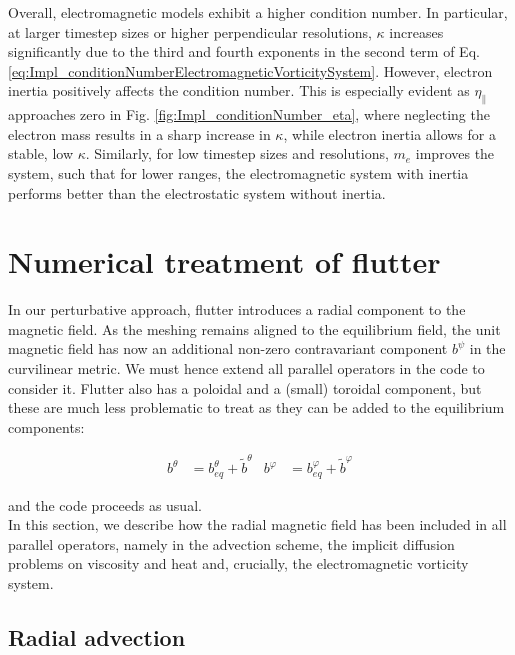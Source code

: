 Overall, electromagnetic models exhibit a higher condition number. In particular, at larger timestep sizes or higher perpendicular resolutions, $\kappa$ increases significantly due to the third and fourth exponents in the second term of Eq. \ref{eq:Impl_conditionNumberElectromagneticVorticitySystem}. However, electron inertia positively affects the condition number. This is especially evident as $\eta_\parallel$ approaches zero in Fig. \ref{fig:Impl_conditionNumber_eta}, where neglecting the electron mass results in a sharp increase in $\kappa$, while electron inertia allows for a stable, low $\kappa$. Similarly, for low timestep sizes and resolutions, $m_e$ improves the system, such that for lower ranges, the electromagnetic system with inertia performs better than the electrostatic system without inertia.





\section{Numerical treatment of flutter}
\label{sec:impl_flutter}
In our perturbative approach, flutter introduces a radial component to the magnetic field. As the meshing remains aligned to the equilibrium field, the unit magnetic field has now an additional non-zero contravariant component $b^\psi$ in the curvilinear metric. We must hence extend all parallel operators in the code to consider it. Flutter also has a poloidal and a (small) toroidal component, but these are much less problematic to treat as they can be added to the equilibrium components:

\begin{align}
	b^\theta &= b_{eq}^\theta + \tilde{b}^\theta & b^\varphi &= b_{eq}^\varphi + \tilde{b}^\varphi
\end{align}

and the code proceeds as usual. \\ 

In this section, we describe how the radial magnetic field has been included in all parallel operators, namely in the advection scheme, the implicit diffusion problems on viscosity and heat and, crucially, the electromagnetic vorticity system.


\subsection{Radial advection}
\label{ssec:impl_flutterAdvection}


